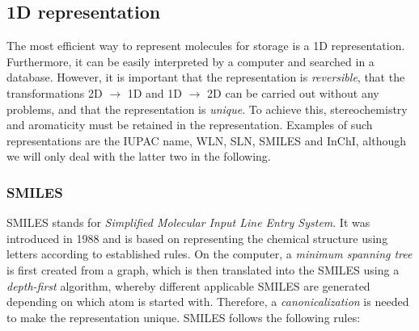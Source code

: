 \subsection{1D representation}

The most efficient way to represent molecules for storage is a 1D representation. Furthermore, it can be easily interpreted by a computer and searched in a database. However, it is important that the representation is \emph{reversible}, that the transformations 2D $\rightarrow$ 1D and 1D $\rightarrow$ 2D can be carried out without any problems, and that the representation is \emph{unique}. To achieve this, stereochemistry and aromaticity must be retained in the representation. Examples of such representations are the IUPAC name, WLN, SLN, SMILES and InChI, although we will only deal with the latter two in the following.

\subsubsection{SMILES}

SMILES stands for \emph{Simplified Molecular Input Line Entry System}. It was introduced in 1988 and is based on representing the chemical structure using letters according to established rules. On the computer, a \emph{minimum spanning tree} is first created from a graph, which is then translated into the SMILES using a \emph{depth-first} algorithm, whereby different applicable SMILES are generated depending on which atom is started with. Therefore, a \emph{canonicalization} is needed to make the representation unique. SMILES follows the following rules:

